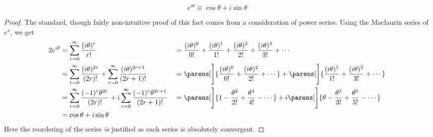\begin{theorem}
 \begin{equation*}
  e^{i\theta} \equiv \cos \theta + i \sin \theta
 \end{equation*}
\end{theorem}
\begin{proof}
 The standard, though fairly non-intuitive proof of this fact comes from a
 consideration of power series. Using the Maclaurin series of \(e^x\), we get
 \begin{alignat*}2
  e^{i\theta} &= \sum_{r = 0}^\infty \frac{(i\theta)^r}{r!}
            &{}={}& \frac{(i\theta)^0}{0!} + \frac{(i\theta)^1}{1!}
               + \frac{(i\theta)^2}{2!} + \frac{(i\theta)^3}{3!} + \dotsb \\
              &= \sum_{r = 0}^\infty \frac{(i\theta)^{2r}}{(2r)!}
               + \sum_{r = 0}^\infty \frac{(i\theta)^{2r + 1}}{(2r + 1)!}
            &{}={}& \parens[\Bigg]{
                  \frac{(i\theta)^0}{0!} + \frac{(i\theta)^2}{2!} + \dotsb}
               + \parens[\Bigg]{
                  \frac{(i\theta)^1}{1!} + \frac{(i\theta)^3}{3!} + \dotsb} \\
              &= \sum_{r = 0}^\infty \frac{(-1)^r\theta^{2r}}{(2r)!}
               + i\sum_{r = 0}^\infty \frac{(-1)^r\theta^{2r + 1}}{(2r + 1)!}
            &{}={}& \parens[\Bigg]{
                  1 - \frac{\theta^2}{2!}
                + \frac{\theta^4}{4!} - \dotsb}
               + i\parens[\Bigg]{
                  \theta - \frac{\theta^3}{3!}
                + \frac{\theta^5}{5!} - \dotsb} \\
              &= \cos \theta + i \sin \theta
 \end{alignat*}
 Here the reordering of the series \emph{is} justified as each series is
 absolutely convergent. %
\end{proof}
